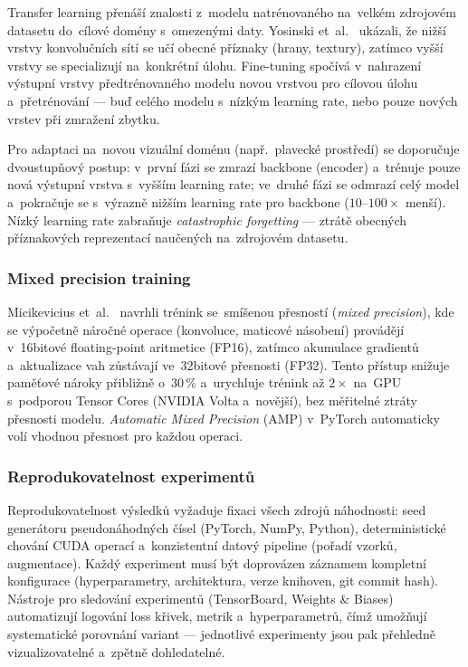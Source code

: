 Transfer learning přenáší znalosti z~modelu natrénovaného na~velkém zdrojovém datasetu do~cílové domény s~omezenými daty. Yosinski et~al.~\cite{yosinski2014transferable} ukázali, že nižší vrstvy konvolučních sítí se učí obecné příznaky (hrany, textury), zatímco vyšší vrstvy se specializují na~konkrétní úlohu. Fine-tuning spočívá v~nahrazení výstupní vrstvy předtrénovaného modelu novou vrstvou pro cílovou úlohu a~přetrénování --- buď celého modelu s~nízkým learning rate, nebo pouze nových vrstev při zmražení zbytku.

Pro adaptaci na~novou vizuální doménu (např.~plavecké prostředí) se doporučuje dvoustupňový postup: v~první fázi se zmrazí backbone (encoder) a~trénuje pouze nová výstupní vrstva s~vyšším learning rate; ve~druhé fázi se odmrazí celý model a~pokračuje se s~výrazně nižším learning rate pro backbone ($10$--$100\times$ menší). Nízký learning rate zabraňuje \emph{catastrophic forgetting} --- ztrátě obecných příznakových reprezentací naučených na~zdrojovém datasetu.

\subsubsection{Mixed precision training}
\label{subsubsec:mixed_precision}

Micikevicius et~al.~\cite{micikevicius2018mixedprecision} navrhli trénink se~smíšenou přesností (\textit{mixed precision}), kde se výpočetně náročné operace (konvoluce, maticové násobení) provádějí v~16bitové floating-point aritmetice (FP16), zatímco akumulace gradientů a~aktualizace vah zůstávají ve~32bitové přesnosti (FP32). Tento přístup snižuje paměťové nároky přibližně o~30\,\% a~urychluje trénink až $2\times$ na~GPU s~podporou Tensor Cores (NVIDIA Volta a~novější), bez měřitelné ztráty přesnosti modelu. \textit{Automatic Mixed Precision} (AMP) v~PyTorch automaticky volí vhodnou přesnost pro každou operaci.

\subsubsection{Reprodukovatelnost experimentů}
\label{subsubsec:reprodukovatelnost}

Reprodukovatelnost výsledků vyžaduje fixaci všech zdrojů náhodnosti: seed generátoru pseudonáhodných čísel (PyTorch, NumPy, Python), deterministické chování CUDA operací a~konzistentní datový pipeline (pořadí vzorků, augmentace). Každý experiment musí být doprovázen záznamem kompletní konfigurace (hyperparametry, architektura, verze knihoven, git commit hash). Nástroje pro sledování experimentů (TensorBoard, Weights \& Biases) automatizují logování loss křivek, metrik a~hyperparametrů, čímž umožňují systematické porovnání variant --- jednotlivé experimenty jsou pak přehledně vizualizovatelné a~zpětně dohledatelné.

